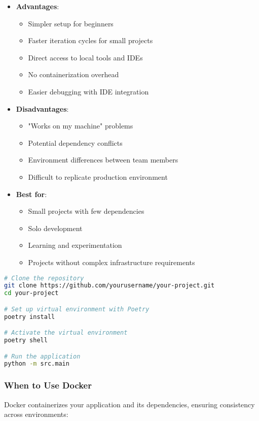 \begin{itemize}
    \item \textbf{Advantages}:
    \begin{itemize}
        \item Simpler setup for beginners
        \item Faster iteration cycles for small projects
        \item Direct access to local tools and IDEs
        \item No containerization overhead
        \item Easier debugging with IDE integration
    \end{itemize}
    
    \item \textbf{Disadvantages}:
    \begin{itemize}
        \item "Works on my machine" problems
        \item Potential dependency conflicts
        \item Environment differences between team members
        \item Difficult to replicate production environment
    \end{itemize}
    
    \item \textbf{Best for}:
    \begin{itemize}
        \item Small projects with few dependencies
        \item Solo development
        \item Learning and experimentation
        \item Projects without complex infrastructure requirements
    \end{itemize}
\end{itemize}

\begin{lstlisting}[language=bash, caption=Local Development Setup]
# Clone the repository
git clone https://github.com/yourusername/your-project.git
cd your-project

# Set up virtual environment with Poetry
poetry install

# Activate the virtual environment
poetry shell

# Run the application
python -m src.main
\end{lstlisting}

\subsubsection{When to Use Docker}
Docker containerizes your application and its dependencies, ensuring consistency across environments:

